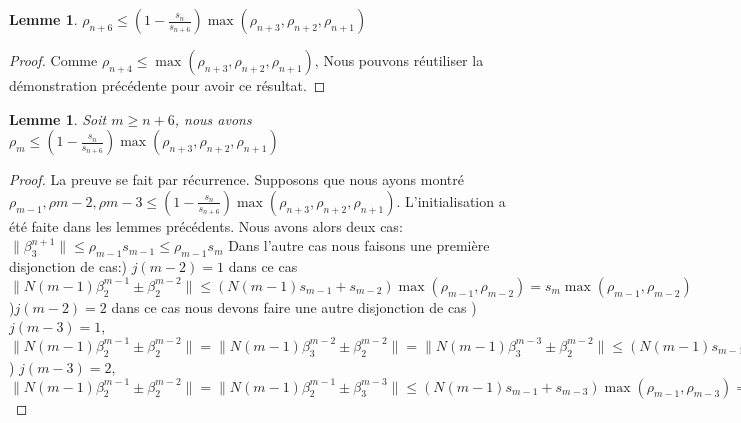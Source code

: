 \documentclass[12pt]{article}
\theoremstyle{plain}%
\newtheorem{lem}[thm]{Lemme}
\theoremstyle{definition}
\theoremstyle{remark}
\begin{document}
\begin{lem}
$\rho_{n+6} \leq (1-\frac{s_n}{s_{n+6}})\max{(\rho_{n+3},\rho_{n+2},\rho_{n+1})}$
\end{lem}
\begin{proof}
Comme $\rho_{n+4} \leq \max{(\rho_{n+3},\rho_{n+2},\rho_{n+1})}$, Nous pouvons réutiliser la démonstration précédente pour avoir ce résultat.
\end{proof}
\begin{lem}
Soit $m \geq n+6$, nous avons $\rho_m \leq (1-\frac{s_n}{s_{n+6}})\max{(\rho_{n+3},\rho_{n+2},\rho_{n+1})}$
\end{lem}
\begin{proof}
La preuve se fait par récurrence. Supposons que nous ayons montré $\rho_{m-1},\rho{m-2},\rho{m-3} \leq (1-\frac{s_n}{s_{n+6}})\max{(\rho_{n+3},\rho_{n+2},\rho_{n+1})}$. L'initialisation a été faite dans les lemmes précédents. Nous avons alors deux cas: \newline
$\| \beta_3^{n+1} \| \leq \rho_{m-1} s_{m-1} \leq \rho_{m-1} s_m$ \newline
Dans l'autre cas nous faisons une première disjonction de cas:) $j(m-2)=1$ dans ce cas $\|N(m-1)\beta_2^{m-1} \pm \beta_2^{m-2}\| \leq (N(m-1)s_{m-1}+s_{m-2}) \max{(\rho_{m-1},\rho_{m-2})}=s_m \max{(\rho_{m-1},\rho_{m-2})}$)$j(m-2)=2$ dans ce cas nous devons faire une autre disjonction de cas ) $j(m-3)=1$, $\|N(m-1)\beta_2^{m-1} \pm \beta_2^{m-2}\|=\|N(m-1)\beta_3^{m-2} \pm \beta_2^{m-2}\|=\|N(m-1)\beta_3^{m-3} \pm \beta_2^{m-2}\| \leq (N(m-1)s_{m-1}+s_{m-3}) \max{(\rho_{m-1},\rho_{m-3})}=s_m \max{(\rho_{m-1},\rho_{m-3})} $) $j(m-3)=2$, $\|N(m-1)\beta_2^{m-1} \pm \beta_2^{m-2}\|=\|N(m-1)\beta_2^{m-1} \pm \beta_3^{m-3}\| \leq (N(m-1)s_{m-1}+s_{m-3})\max{(\rho_{m-1},\rho_{m-3})}=s_m \max{(\rho_{m-1},\rho_{m-3})}$
\end{proof}
\end{document}
